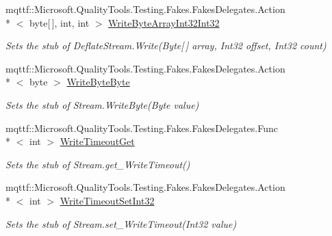 \begin{DoxyCompactItemize}
mqttf\-::\-Microsoft.\-Quality\-Tools.\-Testing.\-Fakes.\-Fakes\-Delegates.\-Action\\*
$<$ byte\mbox{[}$\,$\mbox{]}, int, int $>$ \hyperlink{class_system_1_1_i_o_1_1_compression_1_1_fakes_1_1_stub_deflate_stream_ad8cfd3a95d3a6dbdcaa8f16e3769007f}{Write\-Byte\-Array\-Int32\-Int32}
\begin{DoxyCompactList}\small\item\em Sets the stub of Deflate\-Stream.\-Write(\-Byte\mbox{[}$\,$\mbox{]} array, Int32 offset, Int32 count)\end{DoxyCompactList}\item 
mqttf\-::\-Microsoft.\-Quality\-Tools.\-Testing.\-Fakes.\-Fakes\-Delegates.\-Action\\*
$<$ byte $>$ \hyperlink{class_system_1_1_i_o_1_1_compression_1_1_fakes_1_1_stub_deflate_stream_ab22a858d1864a91fcd466d5bc07f8ccd}{Write\-Byte\-Byte}
\begin{DoxyCompactList}\small\item\em Sets the stub of Stream.\-Write\-Byte(\-Byte value)\end{DoxyCompactList}\item 
mqttf\-::\-Microsoft.\-Quality\-Tools.\-Testing.\-Fakes.\-Fakes\-Delegates.\-Func\\*
$<$ int $>$ \hyperlink{class_system_1_1_i_o_1_1_compression_1_1_fakes_1_1_stub_deflate_stream_a7234fd44465737621d5da352c8432c49}{Write\-Timeout\-Get}
\begin{DoxyCompactList}\small\item\em Sets the stub of Stream.\-get\-\_\-\-Write\-Timeout()\end{DoxyCompactList}\item 
mqttf\-::\-Microsoft.\-Quality\-Tools.\-Testing.\-Fakes.\-Fakes\-Delegates.\-Action\\*
$<$ int $>$ \hyperlink{class_system_1_1_i_o_1_1_compression_1_1_fakes_1_1_stub_deflate_stream_a4963c1874df557fe42f456e6311324d6}{Write\-Timeout\-Set\-Int32}
\begin{DoxyCompactList}\small\item\em Sets the stub of Stream.\-set\-\_\-\-Write\-Timeout(\-Int32 value)\end{DoxyCompactList}\end{DoxyCompactItemize}
